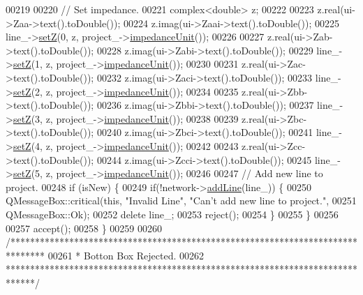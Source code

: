 \begin{DoxyCode}
00219 
00220   \textcolor{comment}{// Set impedance.}
00221   complex<double> z;
00222 
00223   z.real(ui->Zaa->text().toDouble());
00224   z.imag(ui->Zaai->text().toDouble());
00225   line\_->\hyperlink{group___models_ga409df7d11f5c5d594a13fb2f74b3b9e0}{setZ}(0, z, project\_->\hyperlink{class_project_ad0725b9aa4445dd6d21d4e15df482d3b}{impedanceUnit}());
00226 
00227   z.real(ui->Zab->text().toDouble());
00228   z.imag(ui->Zabi->text().toDouble());
00229   line\_->\hyperlink{group___models_ga409df7d11f5c5d594a13fb2f74b3b9e0}{setZ}(1, z, project\_->\hyperlink{class_project_ad0725b9aa4445dd6d21d4e15df482d3b}{impedanceUnit}());
00230 
00231   z.real(ui->Zac->text().toDouble());
00232   z.imag(ui->Zaci->text().toDouble());
00233   line\_->\hyperlink{group___models_ga409df7d11f5c5d594a13fb2f74b3b9e0}{setZ}(2, z, project\_->\hyperlink{class_project_ad0725b9aa4445dd6d21d4e15df482d3b}{impedanceUnit}());
00234 
00235   z.real(ui->Zbb->text().toDouble());
00236   z.imag(ui->Zbbi->text().toDouble());
00237   line\_->\hyperlink{group___models_ga409df7d11f5c5d594a13fb2f74b3b9e0}{setZ}(3, z, project\_->\hyperlink{class_project_ad0725b9aa4445dd6d21d4e15df482d3b}{impedanceUnit}());
00238 
00239   z.real(ui->Zbc->text().toDouble());
00240   z.imag(ui->Zbci->text().toDouble());
00241   line\_->\hyperlink{group___models_ga409df7d11f5c5d594a13fb2f74b3b9e0}{setZ}(4, z, project\_->\hyperlink{class_project_ad0725b9aa4445dd6d21d4e15df482d3b}{impedanceUnit}());
00242 
00243   z.real(ui->Zcc->text().toDouble());
00244   z.imag(ui->Zcci->text().toDouble());
00245   line\_->\hyperlink{group___models_ga409df7d11f5c5d594a13fb2f74b3b9e0}{setZ}(5, z, project\_->\hyperlink{class_project_ad0725b9aa4445dd6d21d4e15df482d3b}{impedanceUnit}());
00246 
00247   \textcolor{comment}{// Add new line to project.}
00248   \textcolor{keywordflow}{if} (isNew) \{
00249     \textcolor{keywordflow}{if}(!network->\hyperlink{group___graphics_gae02945131494987b3ff9b59b627719b4}{addLine}(line\_)) \{
00250       QMessageBox::critical(\textcolor{keyword}{this}, \textcolor{stringliteral}{"Invalid Line"}, \textcolor{stringliteral}{"Can't add new line to project."},
00251                             QMessageBox::Ok);
00252       \textcolor{keyword}{delete} line\_;
00253       reject();
00254     \}
00255   \}
00256 
00257   accept();
00258 \}
00259 
00260 \textcolor{comment}{/*******************************************************************************}
00261 \textcolor{comment}{ * Botton Box Rejected.}
00262 \textcolor{comment}{ ******************************************************************************/}

\end{DoxyCode}

